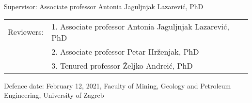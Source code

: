 {{\vskip 6mm
Supervisor: Associate professor Antonia Jaguljnjak Lazarević, PhD 
\vskip 5mm

\begin{tabular}{@{}l l}
    Reviewers:   & 1. Associate professor Antonia Jaguljnjak Lazarević, PhD\\
                 & 2. Associate professor Petar Hrženjak, PhD\\
                 & 3. Tenured professor Željko Andreić, PhD
\end{tabular}

\vfill

Defence date: February 12, 2021, Faculty of Mining, Geology and Petroleum
Engineering, University of Zagreb
}}
\newpage
